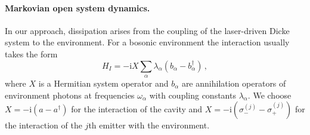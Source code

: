 \documentclass[aps,pra,twocolumn,showpacs,showkeys,10pt,nofootinbib]{revtex4-1}
\newcommand{\rmi}{\mathrm i}
\begin{document}
\paragraph*{Markovian open system dynamics.}
In our approach, dissipation arises from the coupling of the laser-driven Dicke system to the environment.
For a bosonic environment the interaction usually takes the form
\begin{equation}
  H_I = -\rmi X \sum_\alpha \lambda_\alpha (b_\alpha - b_\alpha^\dagger) \,,
\end{equation}
where $X$ is a Hermitian system operator and $b_\alpha$ are annihilation operators of environment photons at frequencies $\omega_\alpha$ with coupling constants $\lambda_\alpha$.
We choose $X=-\rmi(a-a^\dagger)$ for the interaction of the cavity and $X=-\rmi(\sigma_-^{(j)}-\sigma_+^{(j)})$ for the interaction of the $j$th emitter with the environment.
\end{document}
